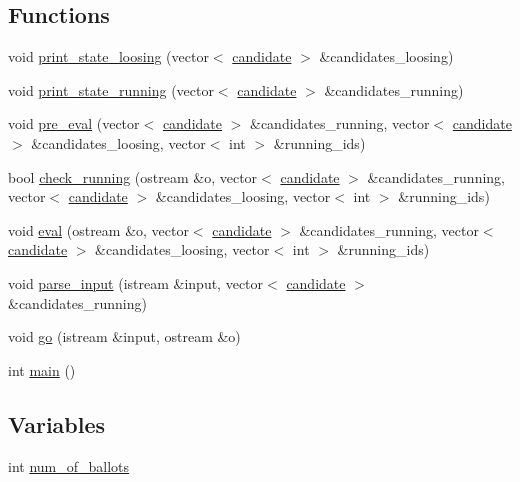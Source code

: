 \subsection*{Functions}
\begin{DoxyCompactItemize}
\item 
void \hyperlink{UVaVoting_8c_09_09_ad79946fd82cde82dee8787630686b33d}{print\-\_\-state\-\_\-loosing} (vector$<$ \hyperlink{classcandidate}{candidate} $>$ \&candidates\-\_\-loosing)
\item 
void \hyperlink{UVaVoting_8c_09_09_a4b4998d94433fb40fa8af618230fe638}{print\-\_\-state\-\_\-running} (vector$<$ \hyperlink{classcandidate}{candidate} $>$ \&candidates\-\_\-running)
\item 
void \hyperlink{UVaVoting_8c_09_09_a8a7f560a8cd57d9bd6536a829943f9c0}{pre\-\_\-eval} (vector$<$ \hyperlink{classcandidate}{candidate} $>$ \&candidates\-\_\-running, vector$<$ \hyperlink{classcandidate}{candidate} $>$ \&candidates\-\_\-loosing, vector$<$ int $>$ \&running\-\_\-ids)
\item 
bool \hyperlink{UVaVoting_8c_09_09_a5a44358626507312e91ec4bd767d74c9}{check\-\_\-running} (ostream \&o, vector$<$ \hyperlink{classcandidate}{candidate} $>$ \&candidates\-\_\-running, vector$<$ \hyperlink{classcandidate}{candidate} $>$ \&candidates\-\_\-loosing, vector$<$ int $>$ \&running\-\_\-ids)
\item 
void \hyperlink{UVaVoting_8c_09_09_ab39aeba1ab637843b2bdc2e21f16348d}{eval} (ostream \&o, vector$<$ \hyperlink{classcandidate}{candidate} $>$ \&candidates\-\_\-running, vector$<$ \hyperlink{classcandidate}{candidate} $>$ \&candidates\-\_\-loosing, vector$<$ int $>$ \&running\-\_\-ids)
\item 
void \hyperlink{UVaVoting_8c_09_09_a0de3afd15c6b7ea2a12b3455b224f56e}{parse\-\_\-input} (istream \&input, vector$<$ \hyperlink{classcandidate}{candidate} $>$ \&candidates\-\_\-running)
\item 
void \hyperlink{UVaVoting_8c_09_09_a909712a187183d0648ea5902f8bd6a1f}{go} (istream \&input, ostream \&o)
\item 
int \hyperlink{UVaVoting_8c_09_09_ae66f6b31b5ad750f1fe042a706a4e3d4}{main} ()
\end{DoxyCompactItemize}
\subsection*{Variables}
\begin{DoxyCompactItemize}
\item 
int \hyperlink{UVaVoting_8c_09_09_ab33dcfe8c5cb1f68caa6b2ae99c1bb75}{num\-\_\-of\-\_\-ballots}
\end{DoxyCompactItemize}


